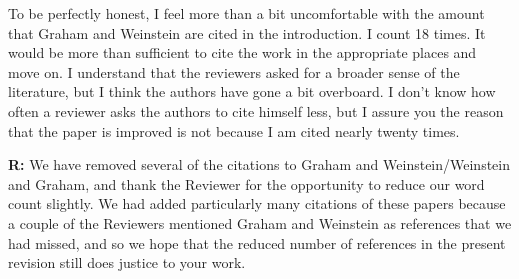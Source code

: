 \documentclass[12pt]{letter}
\newenvironment{refquote}{\bigskip \begin{it}}{\end{it}\smallskip}
\begin{document}
		\begin{refquote}

			To be perfectly honest, I feel more than a bit uncomfortable with the amount that Graham and Weinstein are cited in the introduction. I count 18 times. It would be more than sufficient to cite the work in the appropriate places and move on. I understand that the reviewers asked for a broader sense of the literature, but I think the authors have gone a bit overboard. I don’t know how often a reviewer asks the authors to cite himself less, but I assure you the reason that the paper is improved is not because I am cited nearly twenty times.


		\end{refquote}

		\textbf{R:} We have removed several of the citations to Graham and Weinstein/Weinstein and Graham, and thank the Reviewer for the opportunity to reduce our word count slightly. We had added particularly many citations of these papers because a couple of the Reviewers mentioned Graham and Weinstein as references that we had missed, and so we hope that the reduced number of references in the present revision still does justice to your work.



\clearpage

     
\end{document}
